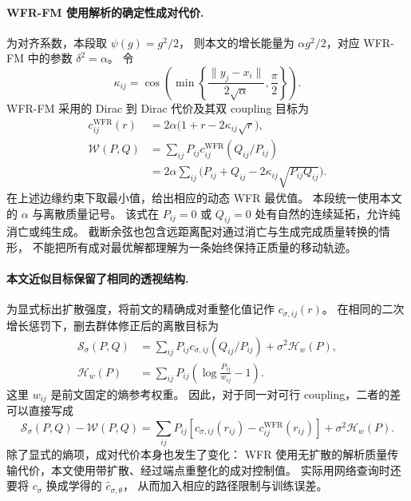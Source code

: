 \documentclass[UTF8,a4paper,11pt,fontset=fandol]{ctexart}
\begin{document}
\paragraph{WFR-FM 使用解析的确定性成对代价.}
为对齐系数，本段取 $\psi(g)=g^2/2$，
则本文的增长能量为 $\alpha g^2/2$，对应 WFR-FM 中的参数 $\delta^2=\alpha$。
令
\begin{equation}
\kappa_{ij}=\cos\!\left(
\min\left\{\frac{\|y_j-x_i\|}{2\sqrt\alpha},\frac\pi2\right\}\right).
\end{equation}
WFR-FM 采用的 Dirac 到 Dirac 代价及其双 coupling 目标为
\begin{equation}
\begin{aligned}
c_{ij}^{\mathrm{WFR}}(r)&=2\alpha\bigl(1+r-2\kappa_{ij}\sqrt r\bigr),\\
\mathcal W(P,Q)
&=\sum_{ij}P_{ij}c_{ij}^{\mathrm{WFR}}(Q_{ij}/P_{ij})\\
&=2\alpha\sum_{ij}
\bigl(P_{ij}+Q_{ij}-2\kappa_{ij}\sqrt{P_{ij}Q_{ij}}\bigr).
\end{aligned}
\label{eq:wfr-semicoupling-comparison}
\end{equation}
在上述边缘约束下取最小值，给出相应的动态 WFR 最优值。
本段统一使用本文的 $\alpha$ 与离散质量记号。
该式在 $P_{ij}=0$ 或 $Q_{ij}=0$ 处有自然的连续延拓，允许纯消亡或纯生成。
截断余弦也包含远距离配对通过消亡与生成完成质量转换的情形，
不能把所有成对最优解都理解为一条始终保持正质量的移动轨迹。

\paragraph{本文近似目标保留了相同的透视结构.}
为显式标出扩散强度，将前文的精确成对重整化值记作 $c_{\sigma,ij}(r)$。
在相同的二次增长惩罚下，删去群体修正后的离散目标为
\begin{equation}
\begin{aligned}
\mathcal S_\sigma(P,Q)
&=\sum_{ij}P_{ij}c_{\sigma,ij}(Q_{ij}/P_{ij})
+\sigma^2\mathcal H_w(P),\\
\mathcal H_w(P)&=\sum_{ij}P_{ij}
\left(\log\frac{P_{ij}}{w_{ij}}-1\right).
\end{aligned}
\label{eq:ruot-wfr-surrogate-comparison}
\end{equation}
这里 $w_{ij}$ 是前文固定的熵参考权重。
因此，对于同一对可行 coupling，二者的差可以直接写成
\begin{equation}
\boxed{
\mathcal S_\sigma(P,Q)-\mathcal W(P,Q)
=\sum_{ij}P_{ij}
\left[c_{\sigma,ij}(r_{ij})-c_{ij}^{\mathrm{WFR}}(r_{ij})\right]
+\sigma^2\mathcal H_w(P).
}
\label{eq:ruot-wfr-objective-difference}
\end{equation}
除了显式的熵项，成对代价本身也发生了变化：
WFR 使用无扩散的解析质量传输代价，本文使用带扩散、经过端点重整化的成对控制值。
实际用网络查询时还要将 $c_\sigma$ 换成学得的 $\widehat c_{\sigma,\theta}$，
从而加入相应的路径限制与训练误差。
\end{document}
